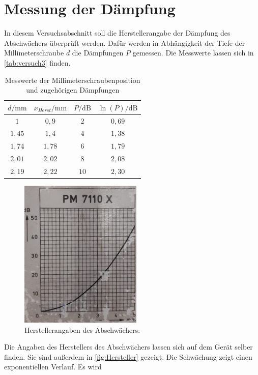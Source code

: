 \section{Messung der Dämpfung}

In diesem Versuchsabschnitt soll die Herstellerangabe der Dämpfung des Abschwächers überprüft werden. Dafür werden in Abhängigkeit der Tiefe der Millimeterschraube $d$ die Dämpfungen $P$
gemessen. Die Messwerte lassen sich in \autoref{tab:versuch3} finden.\\
\begin{table}[htbp] 
    \centering 
    \begin{tabular}{c  c c c} 
        \toprule $d / \mathrm{mm}$  &  $x_{Herst} / \mathrm{mm}$ & $ P / \mathrm{dB}$ & $ \ln{(P)} / \mathrm{dB}$ \\ 
        \midrule 
        $1$     &   $0,9 $& $2 $ &  $0,69$ \\
        $1,45$  &  $1,4$  & $4 $ & $1,38$ \\
        $1,74$  &  $1,78$ & $6 $ & $1,79$ \\
        $2,01$  &  $2,02$ & $8 $ & $2,08$ \\
        $2,19$  &  $2,22$ & $10$ & $2,30$ \\
        \bottomrule 
    \end{tabular} 
    \caption[Tabelle]{Messwerte der Millimeterschraubenposition und zugehörigen Dämpfungen} 
    \label{tab:versuch3} 
\end{table}
\begin{figure}
    \centering
    \includegraphics[scale=0.7]{content/V53_pictures/Hersteller.png}
    \caption{Herstellerangaben des Abschwächers.}
    \label{fig:Hersteller}
\end{figure}
Die Angaben des Herstellers des Abschwächers lassen sich auf dem Gerät selber finden. Sie sind außerdem in \autoref{fig:Hersteller} gezeigt. Die Schwächung zeigt einen exponentiellen Verlauf. Es wird
